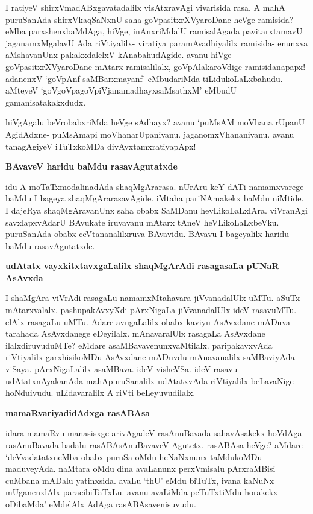 I ratiyeV shirxVmadABxgavatadalilx visAtxravAgi vivarisida rasa. A mahA puruSanAda shirxVkaqSaNxnU saha goVpasitxrXVyaroDane heVge ramisida? eMba parxshenxbaMdAga, hiVge, inAnxriMdalU ramisalAgada pavitarxtamavU jaganamxMgalavU Ada riVtiyalilx- viratiya paramAvadhiyalilx ramisida- enunxva aMshavanUnx pakakxdalelxV kAnabahudAgide. avanu hiVge goVpasitxrXVyaroDane mAtarx ramisalilalx, goVpAlakaroVdige ramisidanapapx! adanenxV `goVpAnf saMBarxmayanf' eMbudariMda tiLidukoLaLxbahudu. aMteyeV `goVgoVpagoVpiVjanamadhayxsaMsathxM' eMbudU gamanisatakakxdudx.

hiVgAgalu beVrobabxriMda heVge sAdhayx? avanu `puMsAM moVhana rUpanU AgidAdxne- puMsAmapi moVhanarUpanivanu. jaganomxVhananivanu. avanu tanagAgiyeV iTuTxkoMDa divAyxtamxratiyapApx!

{\bf BAvaveV haridu baMdu rasavAgutatxde}

idu A moTaTxmodalinadAda shaqMgArarasa. nUrAru keY dATi namamxvarege baMdu I bageya shaqMgArarasavAgide. iMtaha pariNAmakekx baMdu niMtide. I dajeRya shaqMgAravanUnx saha obabx SaMDanu hevLikoLaLxlAra. viVranAgi savxlapxvAdarU BAvukate iruvavanu mAtarx tAneV heVLikoLaLxbeVku. puruSanAda obabx ceVtananalilxruva BAvavidu. BAvavu I bageyalilx haridu baMdu rasavAgutatxde.

{\bf udAtatx vayxkitxtavxgaLalilx shaqMgArAdi rasagasaLa pUNaR AsAvxda}

I shaMgAra-viVrAdi rasagaLu namamxMtahavara jiVvanadalUlx uMTu. aSuTx mAtarxvalalx. pashupakAvxyXdi pArxNigaLa jiVvanadalUlx ideV rasavuMTu. elAlx rasagaLu uMTu. Adare avugaLalilx obabx kaviyu AsAvxdane mADuva tarahada AsAvxdanege eDeyilalx. mAnavaralUlx rasagaLa AsAvxdane ilalxdiruvuduMTe? eMdare asaMBavavenunxvaMtilalx. paripakavxvAda riVtiyalilx garxhisikoMDu AsAvxdane mADuvdu mAnavanalilx saMBaviyAda viSaya. pArxNigaLalilx asaMBava. ideV visheVSa. ideV rasavu udAtatxnAyakanAda mahApuruSanalilx udAtatxvAda riVtiyalilx beLavaNige hoNduivudu. uLidavaralilx A riVti beLeyuvudilalx.

{\bf mamaRvariyadidAdxga rasABAsa}

idara mamaRvu manasisxge arivAgadeV rasAnuBavada sahavAsakekx hoVdAga rasAnuBavada badalu rasABAsAnuBavaveV Agutetx. rasABAsa heVge? aMdare- `deVvadatatxneMba obabx puruSa oMdu heNaNxnunx taMdukoMDu maduveyAda. naMtara oMdu dina avaLanunx perxVmisalu pArxraMBisi cuMbana mADalu yatinxsida. avaLu `thU' eMdu biTuTx, ivana kaNuNx mUganenxlAlx paracibiTaTxLu. avanu avaLiMda peTuTxtiMdu horakekx oDibaMda' eMdelAlx AdAga rasABAsavenisuvudu.


